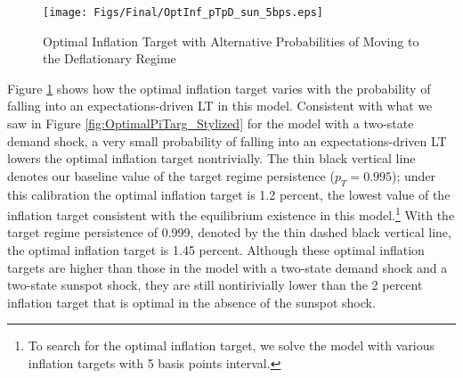 \documentclass[11pt]{article}
\begin{document}
    \begin{figure}[!h]
		\begin{center}
			\caption{Optimal Inflation Target with Alternative Probabilities of Moving to the Deflationary Regime\label{fig:OptimalPiTarg_sun}}
			\texttt{[image: Figs/Final/OptInf\_pTpD\_sun\_5bps.eps]}\\
		\end{center}
	\end{figure}
    
    Figure \ref{fig:OptimalPiTarg_sun} shows how the optimal inflation target varies with the probability of falling into an expectations-driven LT in this model. Consistent with what we saw in Figure \ref{fig:OptimalPiTarg_Stylized} for the model with a two-state demand shock, a very small probability of falling into an expectations-driven LT lowers the optimal inflation target nontrivially. The thin black vertical line denotes our baseline value of the target regime persistence ($p_{T}=0.995$); under this calibration the optimal inflation target is 1.2 percent, the lowest value of the inflation target consistent with the equilibrium existence in this model.\footnote{To search for the optimal inflation target, we solve the model with various inflation targets with 5 basis points interval.} With the target regime persistence of 0.999, denoted by the thin dashed black vertical line, the optimal inflation target is 1.45 percent. Although these optimal inflation targets are higher than those in the model with a two-state demand shock and a two-state sunspot shock, they are still nontirivially lower than the 2 percent inflation target that is optimal in the absence of the sunspot shock.
    
	
	
	
	
	
\end{document}
